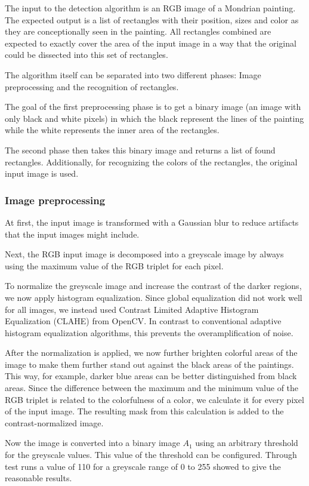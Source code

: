 The input to the detection algorithm is an RGB image of a Mondrian painting. The
expected output is a list of rectangles with their position, sizes and color as
they are conceptionally seen in the painting. All rectangles combined are
expected to exactly cover the area of the input image in a way that the original
could be dissected into this set of rectangles.

The algorithm itself can be separated into two different phases: Image
preprocessing and the recognition of rectangles.

The goal of the first preprocessing phase is to get a binary image (an image
with only black and white pixels) in which the black represent the lines of the
painting while the white represents the inner area of the rectangles.

The second phase then takes this binary image and returns a list of found
rectangles. Additionally, for recognizing the colors of the rectangles, the
original input image is used.

\subsubsection{Image preprocessing}

At first, the input image is transformed with a Gaussian blur to reduce
artifacts that the input images might include.

Next, the RGB input image is decomposed into a greyscale image by always using
the maximum value of the RGB triplet for each pixel.

To normalize the greyscale image and increase the contrast of the darker
regions, we now apply histogram equalization. Since global equalization did not
work well for all images, we instead used Contrast Limited Adaptive Histogram
Equalization (CLAHE) from OpenCV. In contrast to conventional adaptive histogram
equalization algorithms, this prevents the overamplification of noise.

After the normalization is applied, we now further brighten colorful areas of
the image to make them further stand out against the black areas of the
paintings. This way, for example, darker blue areas can be better distinguished
from black areas. Since the difference between the maximum and the minimum value
of the RGB triplet is related to the colorfulness of a color, we calculate it
for every pixel of the input image. The resulting mask from this calculation is
added to the contrast-normalized image.

Now the image is converted into a binary image $A_1$ using an arbitrary
threshold for the greyscale values. This value of the threshold can be
configured. Through test runs a value of 110 for a greyscale range of 0 to 255
showed to give the reasonable results.

